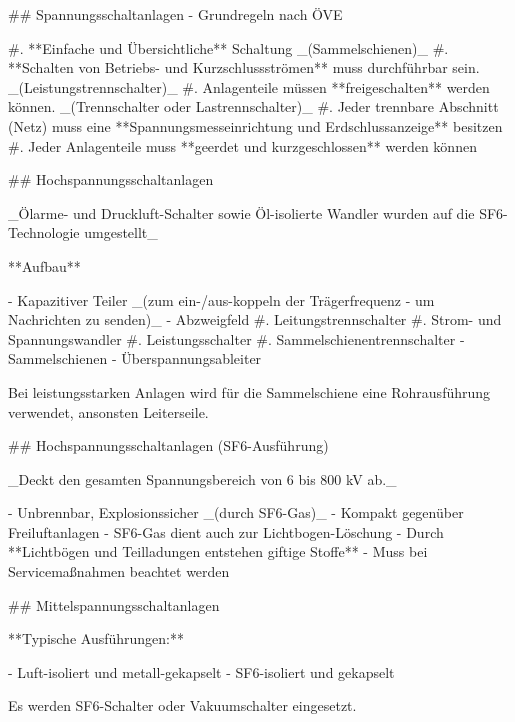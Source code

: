 \begin{markdown}

## Spannungsschaltanlagen - Grundregeln nach ÖVE

#. **Einfache und Übersichtliche** Schaltung _(Sammelschienen)_
#. **Schalten von Betriebs- und Kurzschlussströmen** muss durchführbar sein. _(Leistungstrennschalter)_
#. Anlagenteile müssen **freigeschalten** werden können. _(Trennschalter oder Lastrennschalter)_
#. Jeder trennbare Abschnitt (Netz) muss eine **Spannungsmesseinrichtung und Erdschlussanzeige** besitzen
#. Jeder Anlagenteile muss **geerdet und kurzgeschlossen** werden können

## Hochspannungsschaltanlagen

_Ölarme- und Druckluft-Schalter sowie Öl-isolierte Wandler wurden auf die SF6-Technologie umgestellt_ 

**Aufbau**

- Kapazitiver Teiler _(zum ein-/aus-koppeln der Trägerfrequenz - um Nachrichten zu senden)_
- Abzweigfeld
    #. Leitungstrennschalter
    #. Strom- und Spannungswandler
    #. Leistungsschalter
    #. Sammelschienentrennschalter
- Sammelschienen
- Überspannungsableiter

Bei leistungsstarken Anlagen wird für die Sammelschiene eine Rohrausführung verwendet, ansonsten Leiterseile.

## Hochspannungsschaltanlagen (SF6-Ausführung)


_Deckt den gesamten Spannungsbereich von 6 bis 800 kV ab._

- Unbrennbar, Explosionssicher _(durch SF6-Gas)_
- Kompakt gegenüber Freiluftanlagen
- SF6-Gas dient auch zur Lichtbogen-Löschung
- Durch **Lichtbögen und Teilladungen entstehen giftige Stoffe** - Muss bei Servicemaßnahmen beachtet werden

## Mittelspannungsschaltanlagen

**Typische Ausführungen:**

- Luft-isoliert und metall-gekapselt
- SF6-isoliert und gekapselt

Es werden SF6-Schalter oder Vakuumschalter eingesetzt.

\end{markdown}